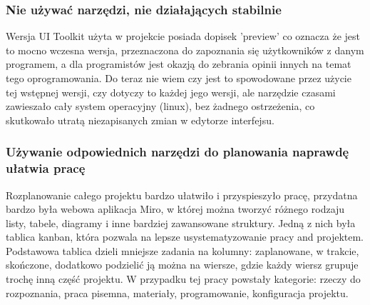 \documentclass{article} %
\begin{document}
    \subsubsection*{Nie używać narzędzi, nie działających stabilnie}
        Wersja UI Toolkit użyta w projekcie posiada dopisek 'preview' co oznacza że jest to mocno wczesna wersja, przeznaczona do zapoznania się użytkowników z danym programem, a dla programistów jest okazją do zebrania opinii innych na temat tego oprogramowania. Do teraz nie wiem czy jest to spowodowane przez użycie tej wstępnej wersji, czy dotyczy to każdej jego wersji, ale narzędzie czasami zawieszało cały system operacyjny (linux), bez żadnego ostrzeżenia, co skutkowało utratą niezapisanych zmian w edytorze interfejsu.
        \\
    
    \subsubsection*{Używanie odpowiednich narzędzi do planowania naprawdę ułatwia pracę}
        Rozplanowanie całego projektu bardzo ułatwiło i przyspieszyło pracę, przydatna bardzo była webowa aplikacja Miro, w której można tworzyć różnego rodzaju listy, tabele, diagramy i inne bardziej zawansowane struktury. Jedną z nich była tablica kanban, która pozwala na lepsze usystematyzowanie pracy and projektem. Podstawowa tablica dzieli mniejsze zadania na kolumny: zaplanowane, w trakcie, skończone, dodatkowo podzielić ją można na wiersze, gdzie każdy wiersz grupuje trochę inną część projektu. W przypadku tej pracy powstały kategorie: rzeczy do rozpoznania, praca pisemna, materiały, programowanie, konfiguracja projektu. 
        \\

        
\newpage
\listoffigures

\newpage


\end{document}
